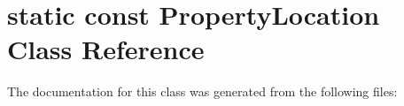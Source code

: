 \hypertarget{classstatic_01const_01PropertyLocation}{}\section{static const Property\+Location Class Reference}
\label{classstatic_01const_01PropertyLocation}


The documentation for this class was generated from the following files\+: